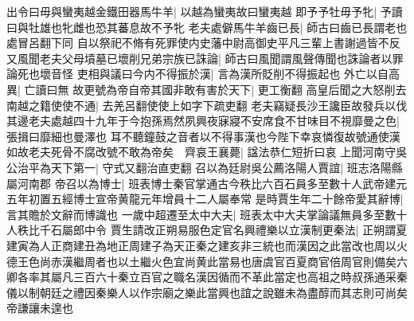 出令曰毋與蠻夷越金鐵田器馬牛羊|{
	以越為蠻夷故曰蠻夷越}
即予予牡毋予牝|{
	予讀曰與牡雄也牝雌也恐其蕃息故不予牝}
老夫處僻馬牛羊齒已長|{
	師古曰齒已長謂老也處冒呂翻下同}
自以祭祀不脩有死罪使内史藩中尉高御史平凡三輩上書謝過皆不反又風聞老夫父母墳墓已壞削兄弟宗族已誅論|{
	師古曰風聞謂風聲傳聞也誅論者以罪論死也壞音怪}
吏相與議曰今内不得振於漢|{
	言為漢所貶削不得振起也}
外亡以自高異|{
	亡讀曰無}
故更號為帝自帝其國非敢有害於天下|{
	更工衡翻}
高皇后聞之大怒削去南越之籍使使不通|{
	去羌呂翻使使上如字下疏吏翻}
老夫竊疑長沙王讒臣故發兵以伐其邊老夫處越四十九年于今抱孫焉然夙興夜寐寢不安席食不甘味目不視靡曼之色|{
	張揖曰靡細也曼澤也}
耳不聽鐘鼓之音者以不得事漢也今陛下幸哀憐復故號通使漢如故老夫死骨不腐改號不敢為帝矣　齊哀王襄薨|{
	諡法恭仁短折曰哀}
上聞河南守吳公治平為天下第一|{
	守式又翻治直吏翻}
召以為廷尉吳公薦洛陽人賈誼|{
	班志洛陽縣屬河南郡}
帝召以為博士|{
	班表博士秦官掌通古今秩比六百石員多至數十人武帝建元五年初置五經博士宣帝黄龍元年增員十二人屬奉常}
是時賈生年二十餘帝愛其辭博|{
	言其贍於文辭而博識也}
一歲中超遷至太中大夫|{
	班表太中大夫掌論議無員多至數十人秩比千石屬郎中令}
賈生請改正朔易服色定官名興禮樂以立漢制更秦法|{
	正朔謂夏建寅為人正商建丑為地正周建子為天正秦之建亥非三統也而漢因之此當改也周以火德王色尚赤漢繼周者也以土繼火色宜尚黄此當易也唐虞官百夏商官倍周官則備矣六卿各率其屬凡三百六十秦立百官之職名漢因循而不革此當定也高祖之時叔孫通采秦儀以制朝廷之禮因秦樂人以作宗廟之樂此當興也誼之說雖未為盡醇而其志則可尚矣}
帝謙讓未遑也


